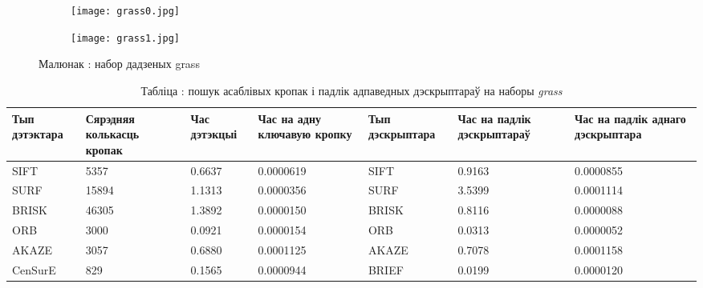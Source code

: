 \begin{figure}[H]
\centering
\begin{subfigure}{.5\textwidth}
  \centering
  \texttt{[image: grass0.jpg]}
\end{subfigure}%
\begin{subfigure}{.5\textwidth}
  \centering
  \texttt{[image: grass1.jpg]}
\end{subfigure}
\captionsetup{labelformat=empty}
\caption{Малюнак : набор дадзеных grass}
\label{fig:grass}
\end{figure}

\begin{table}[h]
  \centering
  \begin{footnotesize}
  \begin{tabular}{ | p{16mm} | p{17mm} | p{19mm} | p{22mm} | p{20mm} | p{22mm} | p{22mm} | }
    \hline
    Тып дэтэктара & Сярэдняя колькасць кропак & Час дэтэкцыі & Час на адну ключавую кропку & Тып дэскрыптара & Час на падлік дэскрыптараў & Час на падлік аднаго дэскрыптара \\ \hline
    SIFT & 5357 & 0.6637 & 0.0000619 & SIFT & 0.9163 & 0.0000855 \\ \hline
    SURF & 15894 & 1.1313 & 0.0000356 & SURF & 3.5399 & 0.0001114 \\ \hline
    BRISK & 46305 & 1.3892 & 0.0000150 & BRISK & 0.8116 & 0.0000088 \\ \hline
    ORB & 3000 & 0.0921 & 0.0000154 & ORB & 0.0313 & 0.0000052 \\ \hline
    AKAZE & 3057 & 0.6880 & 0.0001125 & AKAZE & 0.7078 & 0.0001158 \\ \hline
    CenSurE & 829 & 0.1565 & 0.0000944 & BRIEF & 0.0199 & 0.0000120 \\ \hline
  \end{tabular}
  \end{footnotesize}
\captionsetup{labelformat=empty,justification=centering}
\caption{Табліца : пошук асаблівых кропак і падлік адпаведных дэскрыптараў на наборы \textit{grass}}
\label{table:grass-kp}
\end{table}

